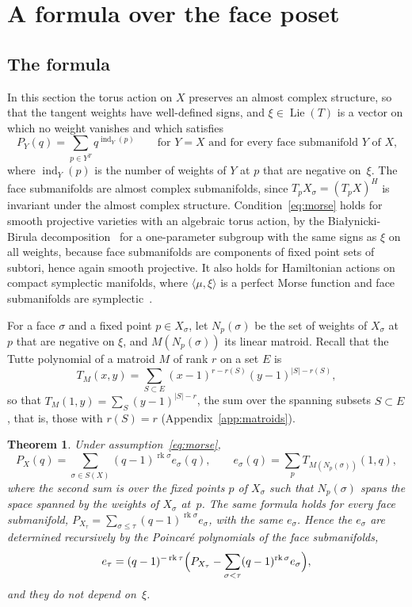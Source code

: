 \documentclass[11pt,a4paper]{article}
\numberwithin{equation}{section}
\theoremstyle{plain}
\newtheorem{theorem}{Theorem}[section]
\theoremstyle{definition}
\theoremstyle{remark}
\DeclareMathOperator{\rk}{rk}
\DeclareMathOperator{\ind}{ind}
\begin{document}
\section{A formula over the face poset}\label{sec:strata}

\subsection{The formula}
In this section the torus action on $X$ preserves an almost complex structure, so that the tangent weights have well-defined signs, and $\xi\in\operatorname{Lie}(T)$ is a vector on which no weight vanishes and which satisfies
\begin{equation}\label{eq:morse}
P_Y(q)=\sum_{p\in Y^T}q^{\ind_Y(p)}\qquad\text{for $Y=X$ and for every face submanifold $Y$ of $X$,}
\end{equation}
where $\ind_Y(p)$ is the number of weights of $Y$ at $p$ that are negative on~$\xi$. The face submanifolds are almost complex submanifolds, since $T_pX_\sigma=(T_pX)^H$ is invariant under the almost complex structure. Condition~\eqref{eq:morse} holds for smooth projective varieties with an algebraic torus action, by the Białynicki-Birula decomposition~\cite{BB73,Car02} for a one-parameter subgroup with the same signs as $\xi$ on all weights, because face submanifolds are components of fixed point sets of subtori, hence again smooth projective. It also holds for Hamiltonian actions on compact symplectic manifolds, where $\langle\mu,\xi\rangle$ is a perfect Morse function and face submanifolds are symplectic~\cite{Ati82,GS82}.

For a face $\sigma$ and a fixed point $p\in X_\sigma$, let $N_p(\sigma)$ be the set of weights of $X_\sigma$ at $p$ that are negative on $\xi$, and $M(N_p(\sigma))$ its linear matroid. Recall that the Tutte polynomial of a matroid $M$ of rank $r$ on a set $E$ is
\[
T_M(x,y)=\sum_{S\subset E}(x-1)^{r-r(S)}(y-1)^{|S|-r(S)},
\]
so that $T_M(1,y)=\sum_S(y-1)^{|S|-r}$, the sum over the spanning subsets $S\subset E$, that is, those with $r(S)=r$ (Appendix~\ref{app:matroids}).

\begin{theorem}\label{thm:strata}
Under assumption~\eqref{eq:morse},
\[
P_X(q)=\sum_{\sigma\in S(X)}(q-1)^{\rk\sigma}e_\sigma(q),\qquad e_\sigma(q)=\sum_{p}T_{M(N_p(\sigma))}(1,q),
\]
where the second sum is over the fixed points $p$ of $X_\sigma$ such that $N_p(\sigma)$ spans the space spanned by the weights of $X_\sigma$ at~$p$. The same formula holds for every face submanifold, $P_{X_\tau}=\sum_{\sigma\leqslant\tau}(q-1)^{\rk\sigma}e_\sigma$, with the same $e_\sigma$. Hence the $e_\sigma$ are determined recursively by the Poincaré polynomials of the face submanifolds,
\begin{equation}\label{eq:e-recursion}
e_\tau=(q-1)^{-\rk\tau}\Bigl(P_{X_\tau}-\sum_{\sigma<\tau}(q-1)^{\rk\sigma}e_\sigma\Bigr),
\end{equation}
and they do not depend on~$\xi$.
\end{theorem}
\end{document}
